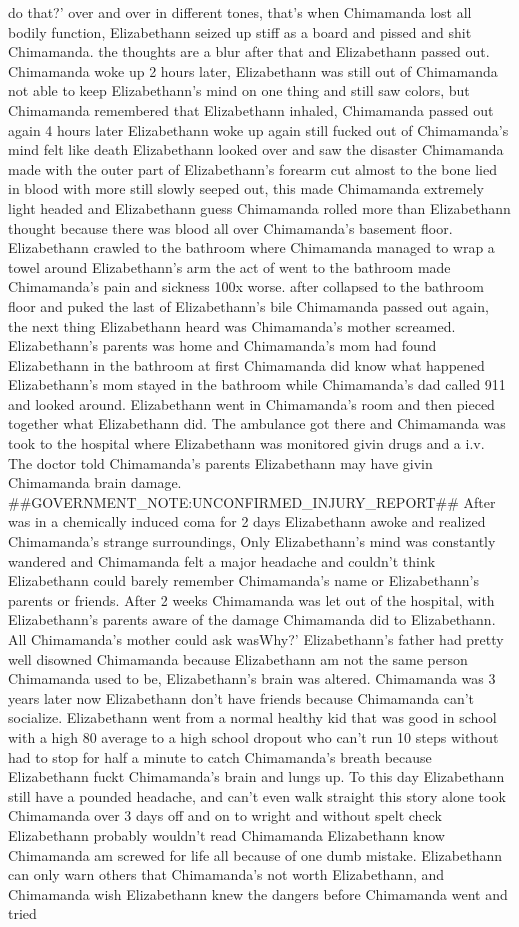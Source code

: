\documentclass[12pt]{book}
\begin{document}
do that?' over and over in different tones, that's when Chimamanda lost all bodily function, Elizabethann seized up stiff as a board and pissed and shit Chimamanda. the thoughts are a blur after that and Elizabethann passed out. Chimamanda woke up 2 hours later, Elizabethann was still out of Chimamanda not able to keep Elizabethann's mind on one thing and still saw colors, but Chimamanda remembered that Elizabethann inhaled, Chimamanda passed out again 4 hours later Elizabethann woke up again still fucked out of Chimamanda's mind felt like death Elizabethann looked over and saw the disaster Chimamanda made with the outer part of Elizabethann's forearm cut almost to the bone lied in blood with more still slowly seeped out, this made Chimamanda extremely light headed and Elizabethann guess Chimamanda rolled more than Elizabethann thought because there was blood all over Chimamanda's basement floor. Elizabethann crawled to the bathroom where Chimamanda managed to wrap a towel around Elizabethann's arm the act of went to the bathroom made Chimamanda's pain and sickness 100x worse. after collapsed to the bathroom floor and puked the last of Elizabethann's bile Chimamanda passed out again, the next thing Elizabethann heard was Chimamanda's mother screamed. Elizabethann's parents was home and Chimamanda's mom had found Elizabethann in the bathroom at first Chimamanda did know what happened Elizabethann's mom stayed in the bathroom while Chimamanda's dad called 911 and looked around. Elizabethann went in Chimamanda's room and then pieced together what Elizabethann did. The ambulance got there and Chimamanda was took to the hospital where Elizabethann was monitored givin drugs and a i.v. The doctor told Chimamanda's parents Elizabethann may have givin Chimamanda brain damage. \#\#GOVERNMENT\_NOTE:UNCONFIRMED\_INJURY\_REPORT\#\# After was in a chemically induced coma for 2 days Elizabethann awoke and realized Chimamanda's strange surroundings, Only Elizabethann's mind was constantly wandered and Chimamanda felt a major headache and couldn't think Elizabethann could barely remember Chimamanda's name or Elizabethann's parents or friends. After 2 weeks Chimamanda was let out of the hospital, with Elizabethann's parents aware of the damage Chimamanda did to Elizabethann. All Chimamanda's mother could ask wasWhy?' Elizabethann's father had pretty well disowned Chimamanda because Elizabethann am not the same person Chimamanda used to be, Elizabethann's brain was altered. Chimamanda was 3 years later now Elizabethann don't have friends because Chimamanda can't socialize. Elizabethann went from a normal healthy kid that was good in school with a high 80 average to a high school dropout who can't run 10 steps without had to stop for half a minute to catch Chimamanda's breath because Elizabethann fuckt Chimamanda's brain and lungs up. To this day Elizabethann still have a pounded headache, and can't even walk straight this story alone took Chimamanda over 3 days off and on to wright and without spelt check Elizabethann probably wouldn't read Chimamanda Elizabethann know Chimamanda am screwed for life all because of one dumb mistake. Elizabethann can only warn others that Chimamanda's not worth Elizabethann, and Chimamanda wish Elizabethann knew the dangers before Chimamanda went and tried 
\end{document}
